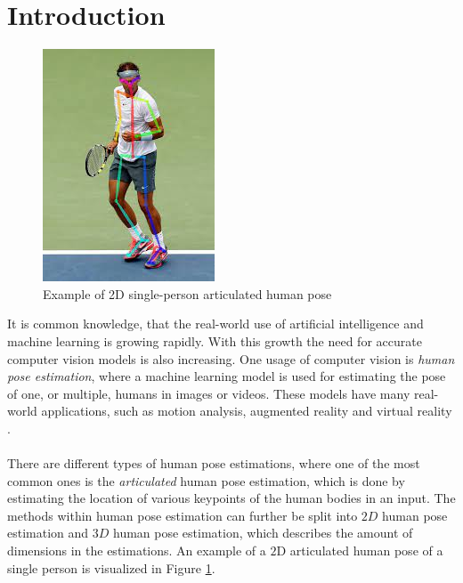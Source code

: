 \documentclass[./main.tex]{subfiles}
\begin{document}
\section{Introduction}\label{sec:introduction}
\begin{figure}[htbp]
    \centering
    \includegraphics[height = 6 cm]{./entities/pose_estimation_example_img.jpg}
    \caption{Example of 2D single-person articulated human pose \cite{pose_estimation_example}}
    \label{fig:pose_estimation_example_fig}
\end{figure}
\noindent It is common knowledge, that the real-world use of artificial intelligence and machine learning is growing rapidly. With this growth the need for accurate computer vision models is also increasing. One usage of computer vision is \textit{human pose estimation}, where a machine learning model is used for estimating the pose of one, or multiple, humans in images or videos. These models have many real-world applications, such as motion analysis, augmented reality and virtual reality \cite{survey_2}.
\\
\\
There are different types of human pose estimations, where one of the most common ones is the \textit{articulated} human pose estimation, which is done by estimating the location of various keypoints of the human bodies in an input. The methods within human pose estimation can further be split into $2D$ human pose estimation and $3D$ human pose estimation, which describes the amount of dimensions in the estimations. An example of a $2$D articulated human pose of a single person is visualized in Figure \ref{fig:pose_estimation_example_fig}.
\\
\\
\end{document}
